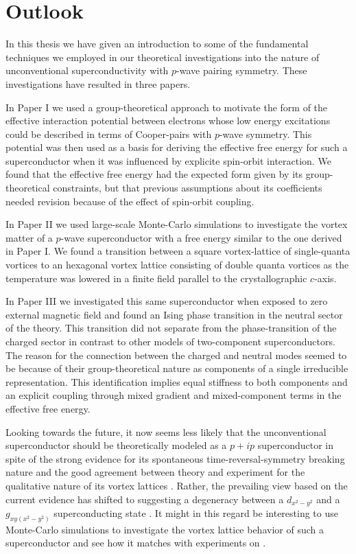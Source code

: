 \chapter{Outlook}\noindent
%
%
In this thesis we have given an introduction to some of the fundamental techniques we employed in our theoretical investigations
into the nature of unconventional superconductivity with $p$-wave pairing symmetry. These investigations have resulted in three papers.

In Paper I we used a group-theoretical approach to
motivate the form of the effective interaction potential between electrons whose low energy excitations could be described
in terms of Cooper-pairs with $p$-wave symmetry. This potential was then used as a basis for deriving the effective free energy
for such a superconductor when it was influenced by explicite spin-orbit interaction. We found that the effective free energy
had the expected form given by its group-theoretical constraints, but that previous assumptions about its coefficients needed
revision because of the effect of spin-orbit coupling.

In Paper II we used large-scale Monte-Carlo simulations to investigate the vortex matter of a $p$-wave superconductor with a free
energy similar to the one derived in Paper I. We found a transition between a square vortex-lattice of single-quanta vortices
to an hexagonal vortex lattice consisting of double quanta vortices as the temperature was lowered in a finite field parallel
to the crystallographic $c$-axis.

In Paper III we investigated this same superconductor when exposed to zero external magnetic field and found an Ising phase transition
in the neutral sector of the theory. This transition did not separate from the phase-transition of the charged sector in contrast
to other models of two-component superconductors. The reason for the connection between the charged and neutral modes seemed to
be because of their group-theoretical nature as components of a single
irreducible representation. This identification implies equal stiffness to both components and an explicit coupling through mixed gradient
and mixed-component terms in the effective free energy.

Looking towards the future, it now seems less likely that the unconventional superconductor  should be theoretically
modeled as a $p+ip$ superconductor in spite of the strong evidence for its spontaneous time-reversal-symmetry breaking nature
\cite{Luke98,Xia06,Grinenko20} and the good
agreement between theory and experiment for the qualitative nature of its vortex lattices \cite{Ray14,AsleGaraud16}. Rather, the
prevailing view based on the current evidence has shifted to suggesting a degeneracy between a $d_{x^2-y^2}$ and a $g_{xy(x^2-y^2)}$ 
superconducting state \cite{Kivelson20,Ghosh21}. It might in this regard be interesting to use Monte-Carlo simulations to
investigate the vortex lattice behavior of such a superconductor and see how it matches with experiments on .

